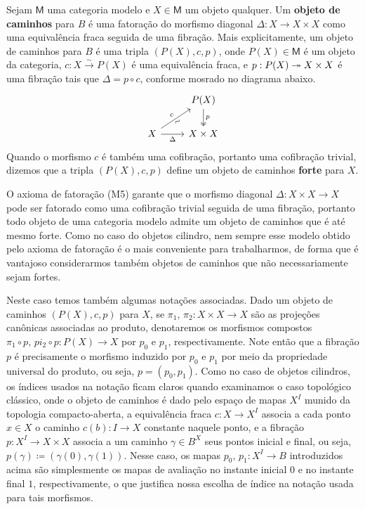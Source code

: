 \begin{defin}\label{defin:obj_de_caminhos}
  Sejam $\mathsf{M}$ uma categoria modelo e $X \in \mathsf{M}$ um objeto qualquer.
  Um \textbf{objeto de caminhos} para $B$ é uma fatoração do morfismo diagonal $\Delta: X \to X \times X$ como uma equivalência fraca seguida de uma fibração.
  Mais explicitamente, um objeto de caminhos para $B$ é uma tripla $(P(X),c,p)$, onde $P(X) \in \mathsf{M}$ é um objeto da categoria, $c: X \overset{\sim}{\to} P(X)$ é uma equivalência fraca, e $p: P(X) \twoheadrightarrow X \times X$ é uma fibração tais que $\Delta = p \circ c$, conforme mosrado no diagrama abaixo.
  \begin{displaymath}
    \begin{tikzcd}
      & P(X)
      \arrow[d, two heads, "p"]
      \\ X
      \arrow[ru, "c", "\sim" {swap,sloped}]
      \arrow[r, "\Delta" swap]
      & X \times X
    \end{tikzcd}
  \end{displaymath}
  Quando o morfismo $c$ é também uma cofibração, portanto uma cofibração trivial, dizemos que a tripla $(P(X),c,p)$ define um objeto de caminhos \textbf{forte} para $X$.
\end{defin}

\begin{obs}
  O axioma de fatoração (M5) garante que o morfismo diagonal $\Delta: X \times X \to X$ pode ser fatorado como uma cofibração trivial seguida de uma fibração, portanto todo objeto de uma categoria modelo admite um objeto de caminhos que é até mesmo forte.
  Como no caso do objetos cilindro, nem sempre esse modelo obtido pelo axioma de fatoração é o mais conveniente para trabalharmos, de forma que é vantajoso considerarmos também objetos de caminhos que não necessariamente sejam fortes.
\end{obs}

Neste caso temos também algumas notações associadas.
Dado um objeto de caminhos $(P(X),c,p)$ para $X$, se $\pi_{1},\,\pi_{2}: X \times X \to X$ são as projeções canônicas associadas ao produto, denotaremos os morfismos compostos $\pi_{1} \circ p,\,pi_{2} \circ p: P(X) \to X$ por $p_{0}$ e $p_{1}$, respectivamente.
Note então que a fibração $p$ é precisamente o morfismo induzido por $p_{0}$ e $p_{1}$ por meio da propriedade universal do produto, ou seja, $p = (p_{0},p_{1})$.
Como no caso de objetos cilindros, os índices usados na notação ficam claros quando examinamos o caso topológico clássico, onde o objeto de caminhos é dado pelo espaço de mapas $X^{I}$ munido da topologia compacto-aberta, a equivalência fraca $c: X \to X^{I}$ associa a cada ponto $x \in X$ o caminho $c(b): I \to X$ constante naquele ponto, e a fibração $p: X^{I} \to X \times X$ associa a um caminho $\gamma \in B^{X}$ seus pontos inicial e final, ou seja, $p(\gamma) \coloneqq (\gamma(0),\gamma(1))$.
Nesse caso, os mapas $p_{0},\,p_{1}: X^{I} \to B$ introduzidos acima são simplesmente os mapas de avaliação no instante inicial $0$ e no instante final $1$, respectivamente, o que justifica nossa escolha de índice na notação usada para tais morfismos.

